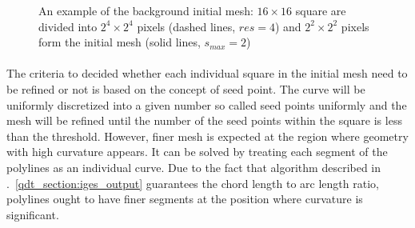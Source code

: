 \begin{figure}[h!]
    \centering
    \caption{An example of the background initial mesh: $16 \times 16$ square are divided into $2^4 \times 2^4$ pixels (dashed lines, $res=4$) and $2^2 \times 2^2$ pixels form the initial mesh (solid lines, $s_{max}=2$)}
    \label{qdt_fig:qdt_initial_mesh}
\end{figure}

\paragraph{}
The criteria to decided whether each individual square in the initial mesh need to be refined or not is based on the concept of seed point.
The curve will be uniformly discretized into a given number so called seed points uniformly and the mesh will be refined until the number of the seed points within the square is less than the threshold.
However, finer mesh is expected at the region where geometry with high curvature appears.
It can be solved by treating each segment of the polylines as an individual curve.
Due to the fact that algorithm described in .~\ref{qdt_section:iges_output} guarantees the chord length to arc length ratio, polylines ought to have finer segments at the position where curvature is significant.

